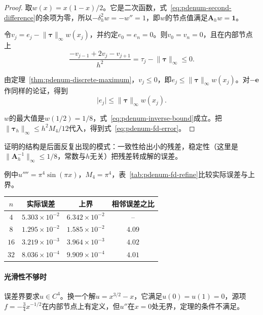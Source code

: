 \begin{proof}
 取$w(x)=x(1-x)/2$。它是二次函数，式~\eqref{eq:pdenum-second-difference}的余项为零，所以$-\delta_h^2w=-w''=1$，即$w$的节点值满足$\bm{A}_hw=\bm{1}$。

 令$v_j=e_j-\lVert\bm{\tau}\rVert_\infty w(x_j)$，并约定$e_0=e_n=0$。则$v_0=v_n=0$，且在内部节点上
 \[
  \frac{-v_{j-1}+2v_j-v_{j+1}}{h^2}=\tau_j-\lVert\bm{\tau}\rVert_\infty\leq0 .
 \]

 由定理~\ref{thm:pdenum-discrete-maximum}，$v_j\leq0$，即$e_j\leq\lVert\bm{\tau}\rVert_\infty w(x_j)$。对$-\bm{e}$作同样的论证，得到
 \[
  \lvert e_j\rvert\leq\lVert\bm{\tau}\rVert_\infty w(x_j) .
 \]

 $w$的最大值是$w(1/2)=1/8$，式~\eqref{eq:pdenum-inverse-bound}成立。把$\lVert\bm{\tau}_h\rVert_\infty\leq h^2M_4/12$代入，得到式~\eqref{eq:pdenum-fd-error}。
\end{proof}

证明的结构是后面反复出现的模式：一致性给出小的残差，稳定性（这里是$\lVert\bm{A}_h^{-1}\rVert_\infty\leq1/8$，常数与$h$无关）把残差转成解的误差。

例中$u''''=\pi^4\sin(\pi x)$，$M_4=\pi^4$，表~\ref{tab:pdenum-fd-refine}比较实际误差与上界。

\begin{BookInlineTable}
 \centering
 \caption{三点格式解问题~\eqref{eq:pdenum-model}的最大模误差和式~\eqref{eq:pdenum-fd-error}的上界。}
 \label{tab:pdenum-fd-refine}
 \begin{tabular}{cccc}
  \toprule
  $n$ & 实际误差 & 上界 & 相邻误差之比\\
  \midrule
  $4$ & $5.303\times10^{-2}$ & $6.342\times10^{-2}$ & --\\
  $8$ & $1.295\times10^{-2}$ & $1.585\times10^{-2}$ & $4.09$\\
  $16$ & $3.219\times10^{-3}$ & $3.964\times10^{-3}$ & $4.02$\\
  $32$ & $8.036\times10^{-4}$ & $9.909\times10^{-4}$ & $4.01$\\
  \bottomrule
 \end{tabular}
\end{BookInlineTable}

\paragraph{光滑性不够时}
误差界要求$u\in C^4$。换一个解$u=x^{3/2}-x$，它满足$u(0)=u(1)=0$，源项$f=-\tfrac34x^{-1/2}$在内部节点上有定义，但$u''$在$x=0$处无界，定理的条件不满足。

